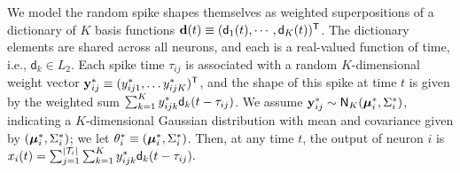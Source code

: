 We model the random spike shapes themselves as weighted superpositions of a dictionary of $K$ basis functions $\mathsf{\mathbf{d}}(t) \equiv (\mathsf{d}_1(t), \cdots, \mathsf{d}_K(t))^{\mathsf{T}}$. The
dictionary elements are shared across all neurons, and each is a real-valued function of time, i.e., $\mathsf{d}_k \in L_2$.
Each spike time $\tau_{ij}$ is associated with a random $K$-dimensional weight vector $\mathbf{y}^*_{ij} \equiv (y^*_{ij1}, \ldots y^*_{ijK})^{\mathsf{T}}$, and the 
shape of this spike at time $t$ is given by the weighted sum $\sum_{k=1}^K y^*_{ijk} \mathsf{d}_k(t-\tau_{ij})$. We assume $\mathbf{y}^*_{ij} \sim \mathsf{N}_K(\boldsymbol{\mu}^*_i, \Sigma^*_i)$, indicating a $K$-dimensional 
Gaussian distribution with mean and covariance given by $(\boldsymbol{\mu}^*_i, \Sigma^*_i)$; we let $ \theta^*_i \equiv (\boldsymbol{\mu}^*_i, \Sigma^*_i) $.   Then, at any time $t$, the output of neuron $i$ is
$
  x_{i}(t) = \sum_{j=1}^{|\mathcal{T}_i|} \sum_{k=1}^K y^*_{ijk} \mathsf{d}_k(t - \tau_{ij}).
$

